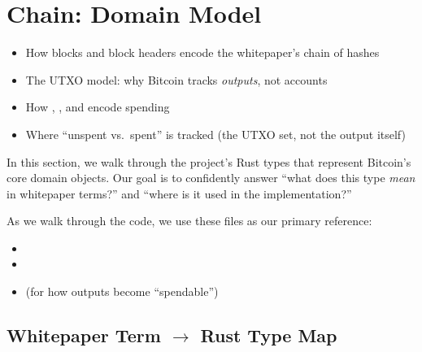 \chapter{Chain: Domain Model}
\label{ch:domain-model}

\begin{learnbox}
\begin{itemize}
  \item How blocks and block headers encode the whitepaper's chain of hashes
  \item The UTXO model: why Bitcoin tracks \emph{outputs}, not accounts
  \item How , , and  encode spending
  \item Where ``unspent vs.\ spent'' is tracked (the UTXO set, not the output itself)
\end{itemize}
\end{learnbox}

In this section, we walk through the project's Rust types that represent
Bitcoin's core domain objects. Our goal is to confidently answer ``what
does this type \emph{mean} in whitepaper terms?'' and ``where is it used
in the implementation?''

As we walk through the code, we use these files as our primary reference:

\begin{itemize}
  \item {}
  \item {}
  \item {} (for how outputs become ``spendable'')
\end{itemize}

\section{Whitepaper Term \texorpdfstring{$\to$}{→} Rust Type Map}
\label{sec:wp-rust-map}

